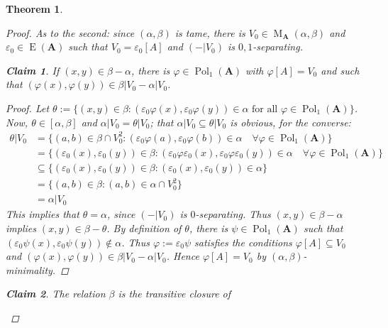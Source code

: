 \documentclass{amsart}
\theoremstyle{plain}
\newtheorem{theorem}{Theorem}[section]
\newtheorem{claim}{Claim}
\theoremstyle{definition}
\theoremstyle{remark}
\def\phi{\varphi}
\def\epsilon{\varepsilon}
\def\A{\forall}
\DeclareMathOperator{\Pol}{Pol}
\DeclareMathOperator{\Id}{E}
\DeclareMathOperator{\M}{M}
\begin{document}
\begin{theorem}
\begin{proof}
        As to the second: since $(\alpha, \beta)$ is tame, there is $V_0 \in \M_\mathbf{A}(\alpha,\beta)$ and $\epsilon_0 \in \Id(\mathbf{A})$ such that $V_0 = \epsilon_0[A]$ and $(-|V_0)$ is $0,1$-separating. 
        \begin{claim}
            \label{lemma_pol_claim1}
            If $(x,y) \in \beta - \alpha$, there is $\phi \in \Pol_1(\mathbf{A})$ with $\phi[A]=V_0$ and such that $(\phi(x), \phi(y)) \in \beta|V_0 - \alpha|V_0$. 
            \begin{proof}
                Let $\theta:=\{(x,y) \in \beta : (\epsilon_0 \phi (x), \epsilon_0 \phi(y)) \in \alpha \text{ for all } \phi \in \Pol_1(\mathbf{A})\}$. 
                Now, $\theta \in [\alpha, \beta]$ and $\alpha |V_0 = \theta|V_0$; 
                that $\alpha |V_0 \subseteq \theta|V_0$ is obvious, for the converse: 
                \begin{align*}
                    \theta|V_0 & = \{ (a,b) \in \beta \cap V^2_0: (\epsilon_0 \phi (a), \epsilon_0 \phi(b)) \in \alpha \quad \A \phi \in \Pol_1(\mathbf{A})\}  \\
                    & = \{(\epsilon_0(x), \epsilon_0(y)) \in \beta : (\epsilon_0 \phi \epsilon_0 (x), \epsilon_0 \phi \epsilon_0 (y)) \in \alpha \quad \A\phi \in \Pol_1(\mathbf{A})\}\\ 
                    & \subseteq \{(\epsilon_0(x), \epsilon_0(y)) \in \beta : (\epsilon_0 (x), \epsilon_0 (y)) \in \alpha \}\\ 
                    & = \{(a,b) \in \beta : (a, b ) \in \alpha \cap V^2_0\}\\ 
                    & = \alpha | V_0 
                \end{align*} 
            This implies that $\theta = \alpha $, since $(-|V_0)$ is $0$-separating. 
            Thus $(x,y) \in \beta - \alpha$ implies $(x,y) \in \beta - \theta$. 
            By definition of $\theta$, there is $\psi \in \Pol_1(\mathbf{A})$ such that $(\epsilon_0 \psi (x), \epsilon_0\psi (y)) \notin \alpha$. 
            Thus $\phi:=\epsilon_0 \psi$ satisfies the conditions $\phi[A] \subseteq V_0$ and $(\phi(x), \phi(y)) \in \beta |V_0 - \alpha|V_0$. 
            Hence $\phi[A] = V_0$ by $(\alpha, \beta)$-minimality. 
            \end{proof}
        \end{claim}
        \begin{claim}
            \label{lemma_pol_claim2}
            The relation $\beta$ is the transitive closure of 
            \begin{equation*}

\end{equation*}
\end{claim}
\end{proof}
\end{theorem}
\end{document}

